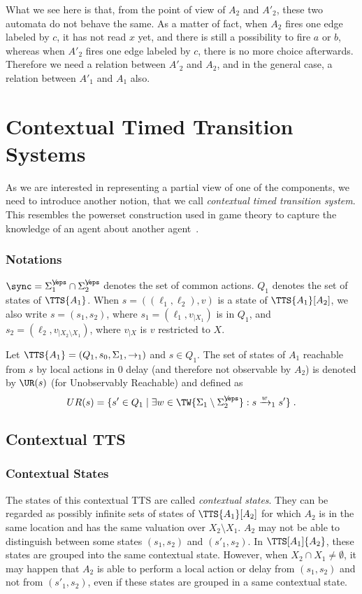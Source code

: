\documentclass{LMCS}
\theoremstyle{plain}\newtheorem*{prop11}{Proposition~\ref{prop:states} bis}
\begin{document}
What we see here is that, from the point of view of $A_2$ and $A'_2$,
these two automata do not behave the same. As a matter of fact, when  $A_2$
fires one edge labeled by $c$, it has not read $x$ yet, and there is still a
possibility to fire $a$ or $b$, whereas when $A'_2$ fires one edge labeled
by $c$, there is no more choice afterwards. Therefore we need a relation
between $A'_2$ and $A_2$, and in the general case,
a relation between $A'_1$ and $A_1$ also.



\section{Contextual Timed Transition Systems}\label{sec:TTS}

As we are interested in representing a partial view of one of the components, we
need to introduce another notion, that we call \emph{contextual timed transition
system}. This resembles the powerset construction used in game theory to
capture the knowledge of an agent about another agent~\cite{Reif}.

\subsubsection*{Notations}
$\sync=\Sigma_{1}^{\not\eps}\cap\Sigma_{2}^{\not\eps}$ denotes the set of common actions.
$Q_1$ denotes the set of states of $\TTS{A_1}$.
When $s=((\ell_1,\ell_2),v)$ is a state of $\TTS{A_1}[A_2]$, we also write
\mbox{$s=(s_1,s_2)$}, where $s_1=(\ell_1,v_{|X_1})$ is in $Q_1$, and
$s_2=(\ell_2,v_{|X_2\setminus X_1})$, where $v_{|X}$ is $v$ restricted to
$X$.


\begin{defi}[$\UR(s)$]
Let \mbox{$\TTS{A_1}=(Q_1,s_0,\Sigma_1,{\rightarrow}_1)$} and $s\in Q_1$.
The set of states of $A_1$ reachable from $s$ by local actions in 0 delay
(and therefore not observ\-able by $A_2$) is denoted by $\UR(s)$ (for
Unobservably Reachable) and defined as
\[UR(s) = \{s'\in Q_1\mid
\exists w\in\TW{\Sigma_1\setminus\Sigma_{2}^{\not\eps}}: s\xrightarrow{w}_1s'\}\;.\]
\end{defi}

\subsection{Contextual TTS}

\subsubsection*{Contextual States}
The states of this contextual TTS are called \emph{contextual states}. They can
be regarded as possibly infinite sets of states of  $\TTS{A_1}[A_2]$ for which
$A_2$ is in the same location and has the same valuation over $X_2\setminus X_1$.
$A_2$ may not be able to distinguish between some states
$(s_1,s_2)$ and $(s'_1,s_2)$. In $\TTS[A_1]{A_2}$, these states are
grouped into the same contextual state.
However, when $X_2\cap X_1\neq\emptyset$, it may happen that $A_2$ is able
to perform a local action or delay from $(s_1,s_2)$ and not from
$(s'_1,s_2)$, even if these states are grouped in a same contextual state.
\end{document}
